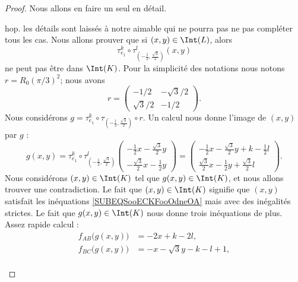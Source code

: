 \begin{proof}
	Nous allons en faire un seul en détail.
	\begin{subproof}
		\spitem[Pour \( L=R_0(\pi/3)K\)]
		hop. les détails sont laissés à notre aimable  qui ne pourra pas ne pas compléter tous les cas.
		\spitem[Pour \( L=R_0(\pi/3)^2K\)]
		Nous allons prouver que si \( (x,y)\in \Int(L)\), alors
		\begin{equation}
			\tau_{e_1}^k\circ \tau_{(-\frac{ 1 }{2},\frac{ \sqrt{ 3 } }{2})}^l(x,y)
		\end{equation}
		ne peut pas être dans \( \Int(K)\). Pour la simplicité des notations nous notons \( r=R_0(\pi/3)^2\); nous avons
		\begin{equation}
			r=\begin{pmatrix}
				-1/2         & -\sqrt{ 3 }/2 \\
				\sqrt{ 3 }/2 & -1/2
			\end{pmatrix}.
		\end{equation}
		Nous considérons \( g=\tau_{e_1}^k\circ\tau_{(-\frac{ 1 }{2},\frac{ \sqrt{ 3 } }{2})}\circ r\). Un calcul nous donne l'image de \( (x,y)\) par \( g\) :
		\begin{equation}
			g(x,y)=\tau_{e_1}^k\circ\tau_{(-\frac{ 1 }{2},\frac{ \sqrt{ 3 } }{2})}^l\begin{pmatrix}
				-\frac{ 1 }{2}x-\frac{ \sqrt{ 3 } }{2}y \\
				-\frac{ \sqrt{ 3 } }{2}x-\frac{ 1 }{2}y
			\end{pmatrix}=\begin{pmatrix}
				-\frac{ 1 }{2}x-\frac{ \sqrt{ 3 } }{2}y+k-\frac{ 1 }{2}l \\
				\frac{ \sqrt{ 3 } }{2}x-\frac{ 1 }{2}y+\frac{ \sqrt{ 3 } }{2}l
			\end{pmatrix}.
		\end{equation}
		Nous considérons \( (x,y)\in \Int(K)\) tel que \( g(x,y)\in \Int(K)\), et nous allons trouver une contradiction. Le fait que \( (x,y)\in \Int(K)\) signifie que \( (x,y)\) satisfait les inéquations \eqref{SUBEQSooECKFooOdneOA} mais avec des inégalités strictes. Le fait que \( g(x,y)\in\Int(K)\) nous donne trois inéquations de plus. Assez rapide calcul :
		\begin{subequations}
			\begin{align}
				f_{AB}\big( g(x,y) \big) & =-2x+k-2l,                                                       \\
				f_{BC}\big( g(x,y) \big) & =-x-\sqrt{ 3 }y-k-l+1,                                           \\

\end{align}
\end{subequations}
\end{subproof}
\end{proof}
